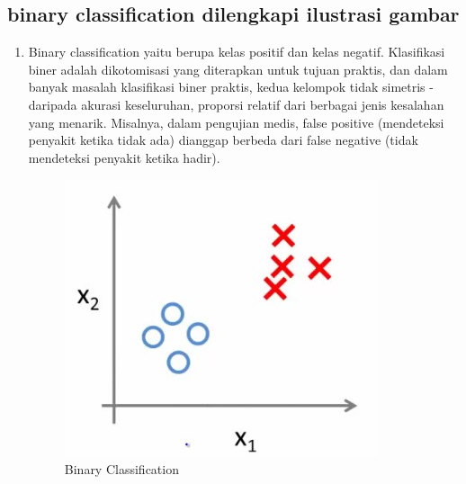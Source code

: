 \begin{enumerate}
\begin{enumerate}
\begin{enumerate}
\begin{enumerate}
\begin{enumerate}
\begin{enumerate}
\begin{enumerate}
\subsection{binary classification dilengkapi ilustrasi gambar}
\begin{enumerate}
\item Binary classification yaitu berupa kelas positif dan kelas negatif. Klasifikasi biner adalah dikotomisasi yang diterapkan untuk tujuan praktis, dan dalam banyak masalah klasifikasi biner praktis, kedua kelompok tidak simetris - daripada akurasi keseluruhan, proporsi relatif dari berbagai jenis kesalahan yang menarik. Misalnya, dalam pengujian medis, false positive (mendeteksi penyakit ketika tidak ada) dianggap berbeda dari false negative (tidak mendeteksi penyakit ketika hadir).
\begin{figure}[ht]
\centering
\includegraphics[scale=0.5]{figures/f1.jpg}
\caption{Binary Classification}
\label{contoh}
\end{figure}


\end{enumerate}
\end{enumerate}
\end{enumerate}
\end{enumerate}
\end{enumerate}
\end{enumerate}
\end{enumerate}
\end{enumerate}

